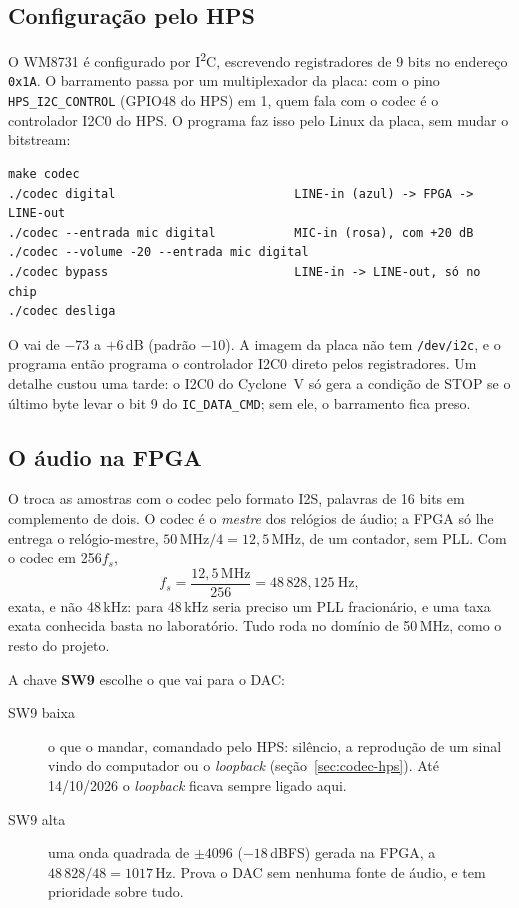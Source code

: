 \subsection{Configuração pelo HPS}

O WM8731 é configurado por I\textsuperscript{2}C, escrevendo registradores de
9 bits no endereço \texttt{0x1A}. O barramento passa por um multiplexador da
placa: com o pino \texttt{HPS\_I2C\_CONTROL} (GPIO48 do HPS) em 1, quem fala com
o codec é o controlador I2C0 do HPS. O programa  faz isso pelo
Linux da placa, sem mudar o bitstream:

\begin{verbatim}
make codec
./codec digital                         LINE-in (azul) -> FPGA -> LINE-out
./codec --entrada mic digital           MIC-in (rosa), com +20 dB
./codec --volume -20 --entrada mic digital
./codec bypass                          LINE-in -> LINE-out, só no chip
./codec desliga
\end{verbatim}

O  vai de \(-73\) a \(+6\)\,dB (padrão \(-10\)). A imagem da
placa não tem \texttt{/dev/i2c}, e o programa então programa o controlador
I2C0 direto pelos registradores. Um detalhe custou uma tarde: o I2C0 do Cyclone~V
só gera a condição de STOP se o último byte levar o bit 9 do
\texttt{IC\_DATA\_CMD}; sem ele, o barramento fica preso.

\subsection{O áudio na FPGA}

O  troca as amostras com o codec pelo formato I2S, palavras de
16 bits em complemento de dois. O codec é o \emph{mestre} dos relógios de
áudio; a FPGA só lhe entrega o relógio-mestre, \(50\,\text{MHz}/4 =
12{,}5\,\text{MHz}\), de um contador, sem PLL. Com o codec em 256\(f_s\),
\[
  f_s = \frac{12{,}5\,\text{MHz}}{256} = 48\,828{,}125\ \text{Hz},
\]
exata, e não 48\,kHz: para 48\,kHz seria preciso um PLL fracionário, e uma
taxa exata conhecida basta no laboratório. Tudo roda no domínio de 50\,MHz,
como o resto do projeto.

A chave \textbf{SW9} escolhe o que vai para o DAC:

\begin{description}
  \item[SW9 baixa] o que o  mandar, comandado pelo HPS:
    silêncio, a reprodução de um sinal vindo do computador ou o
    \emph{loopback} (seção~\ref{sec:codec-hps}). Até 14/10/2026 o
    \emph{loopback} ficava sempre ligado aqui.
  \item[SW9 alta] uma onda quadrada de \(\pm 4096\) (\(-18\)\,dBFS) gerada na
    FPGA, a \(48\,828/48 = 1017\)\,Hz. Prova o DAC sem nenhuma fonte de áudio,
    e tem prioridade sobre tudo.
\end{description}

